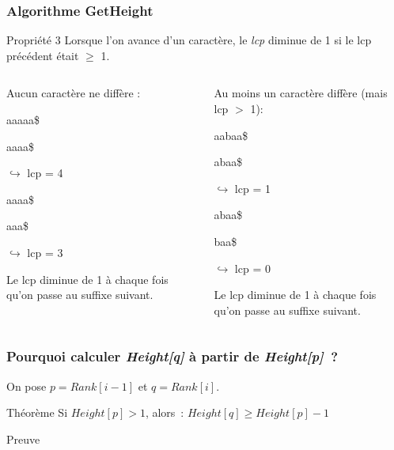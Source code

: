 \documentclass[10pt]{beamer}
\begin{document}
\begin{frame}

  \frametitle{Algorithme GetHeight}
  
  
  \begin{block}{Propriété 3}
    Lorsque l'on avance d'un caractère, le \textit{lcp} diminue de 1
    si le lcp précédent était $\geq$ 1. 
  \end{block}
  
  \pause

  \begin{columns}
    \begin{column}{.48\textwidth}
      
      Aucun caractère ne diffère :
      
      aaaaa\$

      aaaa\$

      $\hookrightarrow$ lcp = 4

      aaaa\$

      aaa\$

      $\hookrightarrow$ lcp = 3

      
      Le lcp diminue de 1 à chaque fois qu'on passe au suffixe suivant.
      
    \end{column}%
    \hfill%
    \pause
    \begin{column}{.48\textwidth}
        
      Au moins un caractère diffère (mais lcp $>$ 1):
      
        aabaa\$

        abaa\$

        $\hookrightarrow$ lcp = 1

        abaa\$

        baa\$

        $\hookrightarrow$ lcp = 0
        
        Le lcp diminue de 1 à chaque fois qu'on passe au suffixe suivant.
        
      \end{column}%
      \end{columns}
  
\end{frame}

\begin{frame}
  \frametitle{Pourquoi calculer \textit{Height[q]} à partir de
    \textit{Height[p]}~?}

  On pose $p = \mathit{Rank}[i-1]$ et $q = \mathit{Rank}[i]$.
  \begin{block}{Théorème}
  Si $\mathit{Height}[p] > 1$, alors~:
  $\mathit{Height}[q] ≥ \mathit{Height}[p] - 1$
  \end{block}
  \begin{block}{Preuve}

  \end{block}
\end{frame}
\end{document}
